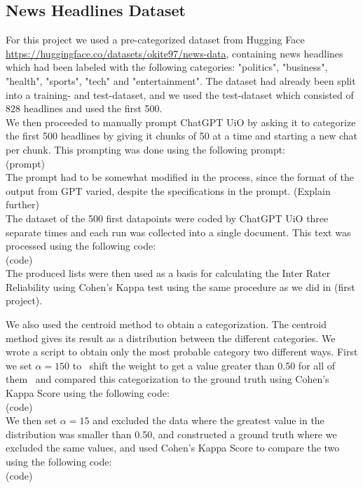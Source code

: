\begin{flushleft}
\subsection{News Headlines Dataset}
For this project we used a pre-categorized dataset from Hugging Face \url{https://huggingface.co/datasets/okite97/news-data}, containing news headlines which had been labeled with the following categories: "politics", "business", "health", "sports", "tech" and "entertainment".
The dataset had already been split into a training- and test-dataset, and we used the test-dataset which consisted of 828 headlines and used the first 500. \\
We then proceeded to manually prompt ChatGPT UiO by asking it to categorize the first 500 headlines by giving it chunks of 50 at a time and starting a new chat per chunk. This prompting 
was done using the following prompt:\\
(prompt)\\
The prompt had to be somewhat modified in the process, since the format of the output from GPT varied, despite the specifications in the prompt. (Explain further)\\[10pt]
The dataset of the 500 first datapoints were coded by ChatGPT UiO three separate times and each run was collected into a single document. This text was processed using the following code:\\
(code)\\
The produced lists were then used as a basis for calculating the Inter Rater Reliability using Cohen's Kappa test using the same procedure as we did in (first project).

We also used the centroid method to obtain a categorization. The centroid method gives its result as a distribution between the different categories. We wrote a script to obtain only the most probable category two different ways.
First we set $\alpha = 150$ to ~shift the weight to get a value greater than 0.50 for all of them~ and compared this categorization to the ground truth using Cohen's Kappa Score using the following code:\\
(code)\\
We then set $\alpha = 15$ and excluded the data where the greatest value in the distribution was smaller than 0.50, and constructed a ground truth where we excluded the same values, 
and used Cohen's Kappa Score to compare the two using the following code:\\
(code)\\


\end{flushleft}
